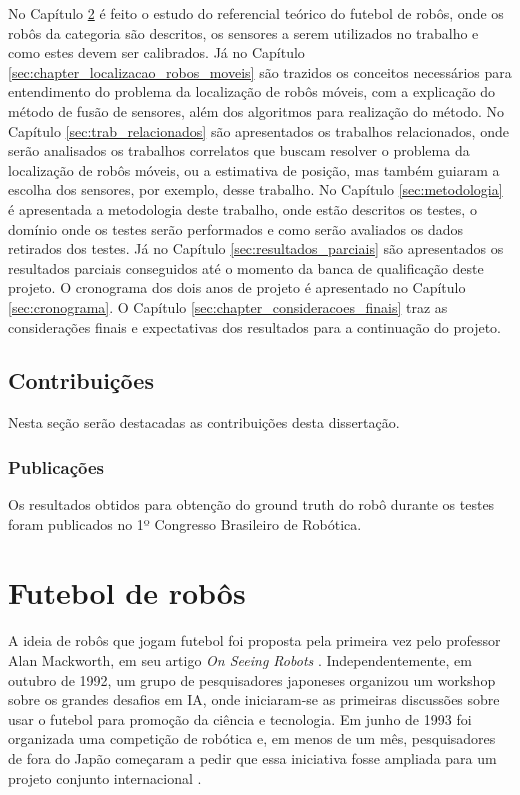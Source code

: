 \documentclass[acronym, symbols, table]{fei}
\begin{document}
		No Capítulo \ref{sec:chapter_futebol_robos} é feito o estudo do referencial teórico do futebol de robôs, onde os robôs da categoria  são descritos, os sensores a serem utilizados no trabalho e como estes devem ser calibrados. Já no Capítulo \ref{sec:chapter_localizacao_robos_moveis} são trazidos os conceitos necessários para entendimento do problema da localização de robôs móveis, com a explicação do método de fusão de sensores, além dos algoritmos para realização do método. No Capítulo \ref{sec:trab_relacionados} são apresentados os trabalhos relacionados, onde serão analisados os trabalhos correlatos que buscam resolver o problema da localização de robôs móveis, ou a estimativa de posição, mas também guiaram a escolha dos sensores, por exemplo, desse trabalho. No Capítulo \ref{sec:metodologia} é apresentada a metodologia deste trabalho, onde estão descritos os testes, o domínio onde os testes serão performados e como serão avaliados os dados retirados dos testes. Já no Capítulo \ref{sec:resultados_parciais} são apresentados os resultados parciais conseguidos até o momento da banca de qualificação deste projeto. O cronograma dos dois anos de projeto é apresentado no Capítulo \ref{sec:cronograma}. O Capítulo \ref{sec:chapter_consideracoes_finais} traz as considerações finais e expectativas dos resultados para a continuação do projeto.
		
	\section{Contribuições}
	
		Nesta seção serão destacadas as contribuições desta dissertação.
		
		\subsection{Publicações}
		
			Os resultados obtidos para obtenção do ground truth do robô durante os testes foram publicados no 1º Congresso Brasileiro de Robótica.

	\chapter{Futebol de robôs}\label{sec:chapter_futebol_robos}
	
		A ideia de robôs que jogam futebol foi proposta pela primeira vez pelo professor Alan Mackworth, em seu artigo \textit{On Seeing Robots} \cite{OnSeeingRobots}. Independentemente, em outubro de 1992, um grupo de pesquisadores japoneses organizou um workshop sobre os grandes desafios em IA, onde iniciaram-se as primeiras discussões sobre usar o futebol para promoção da ciência e tecnologia. Em junho de 1993 foi organizada uma competição de robótica e, em menos de um mês, pesquisadores de fora do Japão começaram a pedir que essa iniciativa fosse ampliada para um projeto conjunto internacional \cite{RoboCup}.
		
\end{document}
